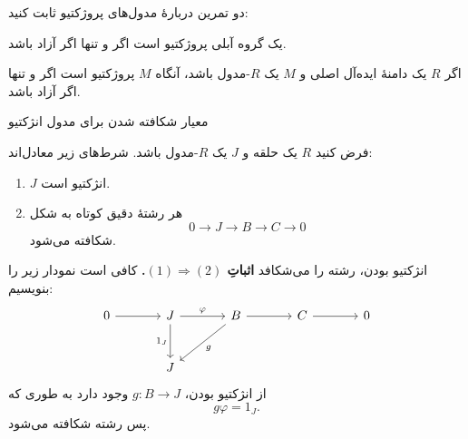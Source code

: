 \begin{frame}[t]{دو تمرین دربارهٔ مدول‌های پروژکتیو}
  \label{lec18:projective-free-exercises}
  ثابت کنید:
  \begin{exercise}
    یک گروه آبلی پروژکتیو است اگر و تنها اگر آزاد باشد.
  \end{exercise}
  \begin{exercise}
    اگر $R$ یک دامنهٔ ایده‌آل اصلی  و $M$ یک $R$-مدول باشد، آنگاه
    $M$ پروژکتیو است اگر و تنها اگر آزاد باشد.
  \end{exercise}
\end{frame}

\begin{frame}[t]{معیار شکافته شدن برای مدول انژکتیو}
  \label{lec18:injective-splitting-theorem}
  \begin{theorem}
    فرض کنید $R$ یک حلقه و $J$ یک $R$-مدول باشد.
    شرط‌های زیر معادل‌اند:
    \begin{enumerate}
      \item $J$ انژکتیو است.
      \item هر رشتهٔ دقیق کوتاه به شکل
        \[
          0\longrightarrow J\longrightarrow B\longrightarrow C\longrightarrow0
        \]
        شکافته می‌شود.
    \end{enumerate}
  \end{theorem}
\end{frame}

\begin{frame}[t]{انژکتیو بودن، رشته را می‌شکافد}
  \label{lec18:injective-splitting-forward}
  \textbf{اثباتِ $(1)\Rightarrow(2)$.}
  کافی است نمودار زیر را بنویسیم:
  \[
    \begin{tikzcd}[ampersand replacement=\&,column sep=large,row sep=large]
      0 \arrow[r] \& J \arrow[r,"\varphi"] \arrow[d,"1_J"']
        \& B \arrow[r] \arrow[dl,"g"] \& C \arrow[r] \& 0 \\
      \& J \& \& \&
    \end{tikzcd}
  \]
  از انژکتیو بودن، $g:B\to J$ وجود دارد به طوری که
  \[
    g\varphi=1_J.
  \]
  پس رشته شکافته می‌شود.
\end{frame}

